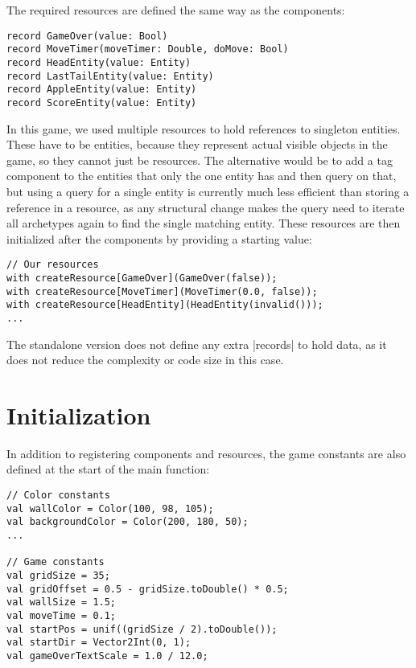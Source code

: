 The required resources are defined the same way as the components:

\begin{lstlisting}
record GameOver(value: Bool)
record MoveTimer(moveTimer: Double, doMove: Bool)
record HeadEntity(value: Entity)
record LastTailEntity(value: Entity)
record AppleEntity(value: Entity)
record ScoreEntity(value: Entity)
\end{lstlisting}

In this game, we used multiple resources to hold references to singleton entities. These have to be entities, because they represent actual visible objects in the game, so they cannot just be resources. The alternative would be to add a tag component to the entities that only the one entity has and then query on that, but using a query for a single entity is currently much less efficient than storing a reference in a resource, as any structural change makes the query need to iterate all archetypes again to find the single matching entity. These resources are then initialized after the components by providing a starting value:

\begin{lstlisting}
// Our resources
with createResource[GameOver](GameOver(false));
with createResource[MoveTimer](MoveTimer(0.0, false));
with createResource[HeadEntity](HeadEntity(invalid()));
...
\end{lstlisting}

The standalone version does not define any extra |records| to hold data, as it does not reduce the complexity or code size in this case.

\section{Initialization}

In addition to registering components and resources, the game constants are also defined at the start of the main function:

\begin{lstlisting}
// Color constants
val wallColor = Color(100, 98, 105);
val backgroundColor = Color(200, 180, 50);
...

// Game constants
val gridSize = 35;
val gridOffset = 0.5 - gridSize.toDouble() * 0.5;
val wallSize = 1.5;
val moveTime = 0.1;
val startPos = unif((gridSize / 2).toDouble());
val startDir = Vector2Int(0, 1);
val gameOverTextScale = 1.0 / 12.0;
\end{lstlisting}

